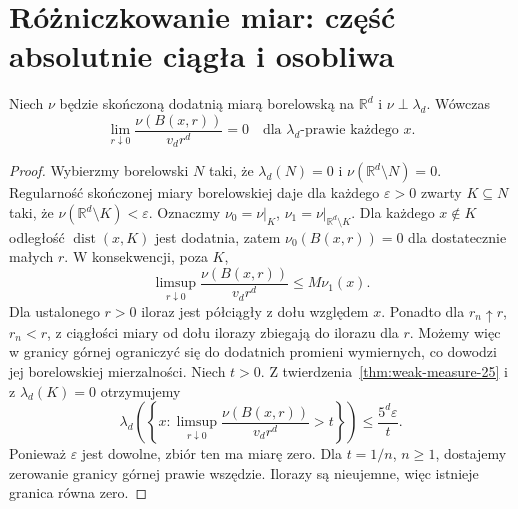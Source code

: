 \section{Różniczkowanie miar: część absolutnie ciągła i osobliwa}
\begin{lemat}
\label{lem:singular-density-25}
Niech $\nu$ będzie skończoną dodatnią miarą borelowską
na $\mathbb R^d$ i $\nu\perp\lambda_d$. Wówczas
\begin{equation}\label{eq:singular-density-25}
 \lim_{r\downarrow0}\frac{\nu(B(x,r))}{v_dr^d}=0
 \quad\text{dla }\lambda_d\text{-prawie każdego }x.
\end{equation}
\end{lemat}
\begin{proof}
Wybierzmy borelowski $N$ taki, że $\lambda_d(N)=0$
i $\nu(\mathbb R^d\setminus N)=0$. Regularność
skończonej miary borelowskiej daje dla każdego
$\varepsilon>0$ zwarty $K\subseteq N$ taki, że
$\nu(\mathbb R^d\setminus K)<\varepsilon$.
Oznaczmy $\nu_0=\nu|_K$, $\nu_1=\nu|_{\mathbb R^d\setminus K}$.
Dla każdego $x\notin K$ odległość $\operatorname{dist}(x,K)$
jest dodatnia, zatem $\nu_0(B(x,r))=0$ dla dostatecznie
małych $r$. W konsekwencji, poza $K$,
\[
 \limsup_{r\downarrow0}\frac{\nu(B(x,r))}{v_dr^d}
 \le M\nu_1(x).
\]
Dla ustalonego $r>0$ iloraz jest półciągły z dołu
względem $x$. Ponadto dla $r_n\uparrow r$, $r_n<r$,
z ciągłości miary od dołu ilorazy zbiegają do ilorazu
dla $r$. Możemy więc w granicy górnej ograniczyć się
do dodatnich promieni wymiernych, co dowodzi jej
borelowskiej mierzalności.
Niech $t>0$. Z twierdzenia~\ref{thm:weak-measure-25}
i z $\lambda_d(K)=0$ otrzymujemy
\[
 \lambda_d\left(\left\{x:\limsup_{r\downarrow0}
 \frac{\nu(B(x,r))}{v_dr^d}>t\right\}\right)
 \le\frac{5^d\varepsilon}{t}.
\]
Ponieważ $\varepsilon$ jest dowolne, zbiór ten ma
miarę zero. Dla $t=1/n$, $n\ge1$, dostajemy
zerowanie granicy górnej prawie wszędzie. Ilorazy są
nieujemne, więc istnieje granica równa zero.
\end{proof}

